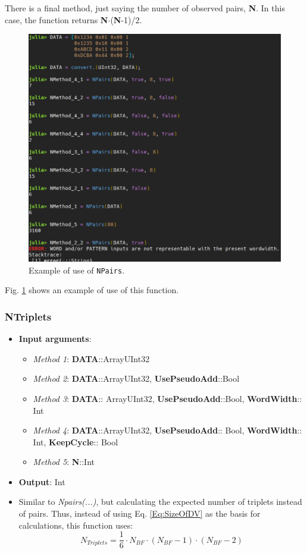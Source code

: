 \begin{itemize}
	There is a final method, just saying the number of observed pairs, \textbf{N}. In this case, the function returns \textbf{N}\(\cdot\)(\textbf{N}-1)/2.

	\begin{figure}[h!]
		\centering
		\includegraphics[width=0.75\columnwidth]{fig/functions/NPairs.png}
		\caption{Example of use of \texttt{NPairs}.}
		\label{fig:Example_NPAirs}
	\end{figure}

	Fig. \ref{fig:Example_NPAirs} shows an example of use of this function. 
	
\end{itemize}
%
\subsubsection*{NTriplets}\label{Func:NTriplets}
\begin{itemize}
	\item \textbf{Input arguments}:
	\begin{itemize}
		\item \textit{Method 1}: \textbf{DATA}::Array{UInt32}
		\item \textit{Method 2}: \textbf{DATA}::Array{UInt32}, \textbf{UsePseudoAdd}::Bool
		\item \textit{Method 3}: \textbf{DATA}:: Array{UInt32}, \textbf{UsePseudoAdd}::Bool, \textbf{WordWidth}:: Int
		\item \textit{Method 4}: \textbf{DATA}::Array{UInt32}, \textbf{UsePseudoAdd}:: Bool, \textbf{WordWidth}:: Int, \textbf{KeepCycle}:: Bool
		\item \textit{Method 5}: \textbf{N}::Int
	\end{itemize}
	\item \textbf{Output}: Int
	\item Similar to \textit{Npairs(...)}, but calculating the expected number of triplets instead of pairs. Thus, instead of using Eq. \ref{Eq:SizeOfDV} as the basis for calculations, this function uses:
	\[
		N_{Triplets} = \frac{1}{6}\cdot N_{BF}\cdot \left(N_{BF}-1\right)\cdot \left(N_{BF}-2\right)
	\]
\end{itemize}
%
